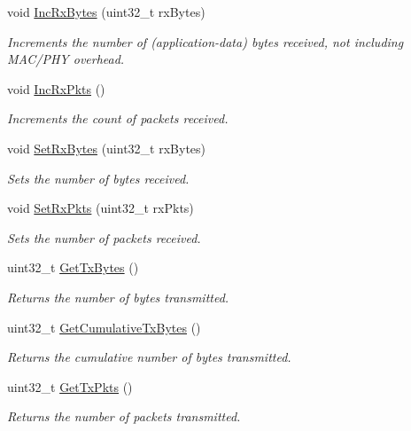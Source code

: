 \begin{DoxyCompactItemize}
void \hyperlink{classRoutingStats_a15717ab972a3fb1cb86659e113bdb796}{Inc\+Rx\+Bytes} (uint32\+\_\+t rx\+Bytes)
\begin{DoxyCompactList}\small\item\em Increments the number of (application-\/data) bytes received, not including M\+A\+C/\+P\+HY overhead. \end{DoxyCompactList}\item 
void \hyperlink{classRoutingStats_a2ff73151fd53b0f8a9603a81a9e4f467}{Inc\+Rx\+Pkts} ()
\begin{DoxyCompactList}\small\item\em Increments the count of packets received. \end{DoxyCompactList}\item 
void \hyperlink{classRoutingStats_af83449b8cc9a2fe9794db8c6b56f1ef9}{Set\+Rx\+Bytes} (uint32\+\_\+t rx\+Bytes)
\begin{DoxyCompactList}\small\item\em Sets the number of bytes received. \end{DoxyCompactList}\item 
void \hyperlink{classRoutingStats_a58ba0c95aeabe1d060ee854f97fe2dba}{Set\+Rx\+Pkts} (uint32\+\_\+t rx\+Pkts)
\begin{DoxyCompactList}\small\item\em Sets the number of packets received. \end{DoxyCompactList}\item 
uint32\+\_\+t \hyperlink{classRoutingStats_a45a7d3e7e500e87b1ecfcef5a1df88ea}{Get\+Tx\+Bytes} ()
\begin{DoxyCompactList}\small\item\em Returns the number of bytes transmitted. \end{DoxyCompactList}\item 
uint32\+\_\+t \hyperlink{classRoutingStats_ac3553f60b36e358540d8f21a91f20a4b}{Get\+Cumulative\+Tx\+Bytes} ()
\begin{DoxyCompactList}\small\item\em Returns the cumulative number of bytes transmitted. \end{DoxyCompactList}\item 
uint32\+\_\+t \hyperlink{classRoutingStats_a0f77f851441c93841686b5cdcc76f1a8}{Get\+Tx\+Pkts} ()
\begin{DoxyCompactList}\small\item\em Returns the number of packets transmitted. \end{DoxyCompactList}\item 

\end{DoxyCompactItemize}
